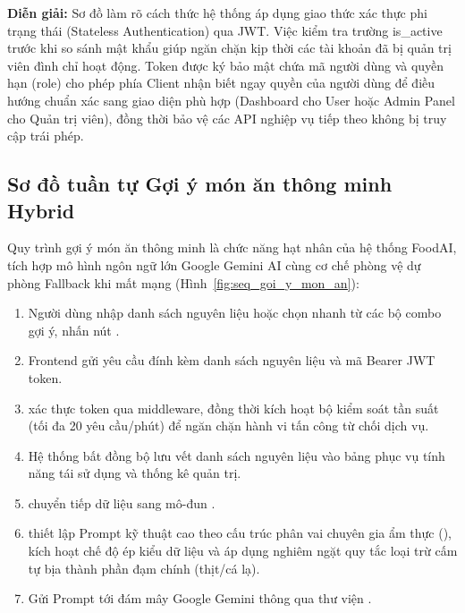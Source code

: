 \noindent\textbf{Diễn giải:} Sơ đồ làm rõ cách thức hệ thống áp dụng giao thức xác thực phi trạng thái (Stateless Authentication) qua JWT. Việc kiểm tra trường is\_active trước khi so sánh mật khẩu giúp ngăn chặn kịp thời các tài khoản đã bị quản trị viên đình chỉ hoạt động. Token được ký bảo mật chứa mã người dùng và quyền hạn (role) cho phép phía Client nhận biết ngay quyền của người dùng để điều hướng chuẩn xác sang giao diện phù hợp (Dashboard cho User hoặc Admin Panel cho Quản trị viên), đồng thời bảo vệ các API nghiệp vụ tiếp theo không bị truy cập trái phép.

\subsection{Sơ đồ tuần tự Gợi ý món ăn thông minh Hybrid}

Quy trình gợi ý món ăn thông minh là chức năng hạt nhân của hệ thống FoodAI, tích hợp mô hình ngôn ngữ lớn Google Gemini AI cùng cơ chế phòng vệ dự phòng Fallback khi mất mạng (Hình~\ref{fig:seq_goi_y_mon_an}):
\begin{enumerate}[leftmargin=1.6em, itemsep=2pt]
  \item Người dùng nhập danh sách nguyên liệu hoặc chọn nhanh từ các bộ combo gợi ý, nhấn nút .
  \item Frontend gửi yêu cầu  đính kèm danh sách nguyên liệu và mã Bearer JWT token.
  \item {} xác thực token qua middleware, đồng thời kích hoạt bộ kiểm soát tần suất  (tối đa 20 yêu cầu/phút) để ngăn chặn hành vi tấn công từ chối dịch vụ.
  \item Hệ thống bất đồng bộ lưu vết danh sách nguyên liệu vào bảng  phục vụ tính năng tái sử dụng và thống kê quản trị.
  \item {} chuyển tiếp dữ liệu sang mô-đun .
  \item {} thiết lập Prompt kỹ thuật cao theo cấu trúc phân vai chuyên gia ẩm thực (), kích hoạt chế độ ép kiểu dữ liệu  và áp dụng nghiêm ngặt quy tắc loại trừ cấm tự bịa thành phần đạm chính (thịt/cá lạ).
  \item Gửi Prompt tới đám mây Google Gemini thông qua thư viện .
\end{enumerate}

